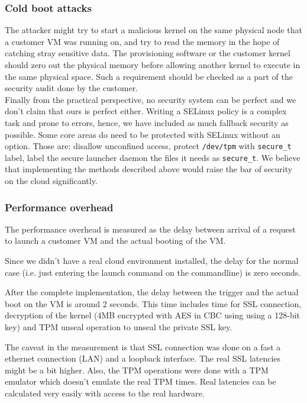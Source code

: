 \documentclass[10pt,twocolumn,pdftex]{article}
\begin{document}
\subsubsection{Cold boot attacks}
The attacker might try to start a malicious kernel on the same physical node that a customer VM was running on, and try to read the memory in the hope of catching stray sensitive data. The provisioning software or the customer kernel should zero out the physical memory before allowing another kernel to execute in the same physical space. Such a requirement should be checked as a part of the security audit done by the customer. 
\\

Finally from the practical perspective, no security system can be perfect and we don't claim that ours is perfect either. Writing a SELinux policy is a complex task and prone to errors, hence, we have included as much fallback security as possible. Some core areas do need to be protected with SELinux without an option. Those are: disallow unconfined access, protect {\tt /dev/tpm} with {\tt secure\_t} label, label the secure launcher daemon the files it needs as {\tt secure\_t}. We believe that implementing the methods described above would raise the bar of security on the cloud significantly.

\subsubsection{Performance overhead}
The performance overhead is measured as the delay between arrival of a request to launch a customer VM and the actual booting of the VM. 

Since we didn't have a real cloud environment installed, the delay for the normal case (i.e. just entering the launch command on the commandline) is zero seconds.

After the complete implementation, the delay between the trigger and the actual boot on the VM is around 2 seconds. This time includes time for SSL connection, decryption of the kernel (4MB encrypted with AES in CBC using using a 128-bit key) and TPM unseal operation to unseal the private SSL key. 

The caveat in the measurement is that SSL connection was done on a fast a ethernet connection (LAN) and a loopback interface. The real SSL latencies might be a bit higher. Also, the TPM operations were done with a TPM emulator which doesn't emulate the real TPM times. Real latencies can be calculated very easily with access to the real hardware. 
\end{document}
